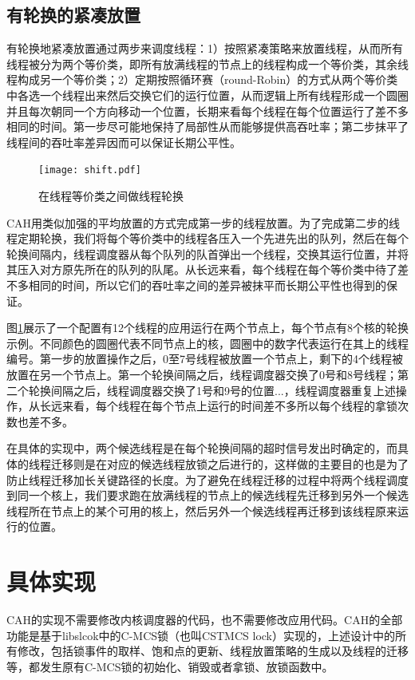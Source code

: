 \subsection{有轮换的紧凑放置}
有轮换地紧凑放置通过两步来调度线程：1）按照紧凑策略来放置线程，从而所有线程被分为两个等价类，即所有放满线程的节点上的线程构成一个等价类，其余线程构成另一个等价类；2）定期按照循环赛（round-Robin）的方式从两个等价类中各选一个线程出来然后交换它们的运行位置，从而逻辑上所有线程形成一个圆圈并且每次朝同一个方向移动一个位置，长期来看每个线程在每个位置运行了差不多相同的时间。第一步尽可能地保持了局部性从而能够提供高吞吐率；第二步抹平了线程间的吞吐率差异因而可以保证长期公平性。
\begin{figure}[t]
	\centering
	\texttt{[image: shift.pdf]}
	\caption{在线程等价类之间做线程轮换}
	\label{Fig:shift}
\end{figure}

CAH用类似加强的平均放置的方式完成第一步的线程放置。为了完成第二步的线程定期轮换，我们将每个等价类中的线程各压入一个先进先出的队列，然后在每个轮换间隔内，线程调度器从每个队列的队首弹出一个线程，交换其运行位置，并将其压入对方原先所在的队列的队尾。从长远来看，每个线程在每个等价类中待了差不多相同的时间，所以它们的吞吐率之间的差异被抹平而长期公平性也得到的保证。

图\ref{Fig:shift}展示了一个配置有12个线程的应用运行在两个节点上，每个节点有8个核的轮换示例。不同颜色的圆圈代表不同节点上的核，圆圈中的数字代表运行在其上的线程编号。第一步的放置操作之后，0至7号线程被放置一个节点上，剩下的4个线程被放置在另一个节点上。第一个轮换间隔之后，线程调度器交换了0号和8号线程；第二个轮换间隔之后，线程调度器交换了1号和9号的位置...，线程调度器重复上述操作，从长远来看，每个线程在每个节点上运行的时间差不多所以每个线程的拿锁次数也差不多。

在具体的实现中，两个候选线程是在每个轮换间隔的超时信号发出时确定的，而具体的线程迁移则是在对应的候选线程放锁之后进行的，这样做的主要目的也是为了防止线程迁移加长关键路径的长度。为了避免在线程迁移的过程中将两个线程调度到同一个核上，我们要求跑在放满线程的节点上的候选线程先迁移到另外一个候选线程所在节点上的某个可用的核上，然后另外一个候选线程再迁移到该线程原来运行的位置。

\section{具体实现}
CAH的实现不需要修改内核调度器的代码，也不需要修改应用代码。CAH的全部功能是基于libslcok\cite{kashyap2017scalable}中的C-MCS锁（也叫CSTMCS lock）实现的，上述设计中的所有修改，包括锁事件的取样、饱和点的更新、线程放置策略的生成以及线程的迁移等，都发生原有C-MCS锁的初始化、销毁或者拿锁、放锁函数中。


